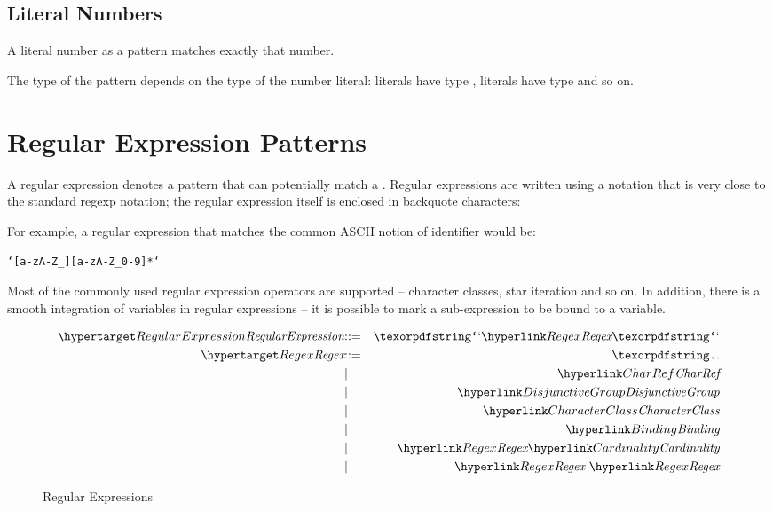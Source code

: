 \subsection{Literal Numbers}
\label{literalNumberPattern}

A literal number as a pattern matches exactly that number.

The type of the pattern depends on the type of the number literal:  literals have type ,  literals have type  and so on.


\section{Regular Expression Patterns}
\label{regularExpressions}
A regular expression denotes a pattern that can potentially match a . Regular expressions are written using a notation that is very close to the standard regexp notation; the regular expression itself is enclosed in backquote characters: 

For example, a regular expression that matches the common ASCII notion of identifier would be:
\begin{alltt}
`[a-zA-Z_][a-zA-Z_0-9]*`
\end{alltt}

Most of the commonly used regular expression operators are supported -- character classes, star iteration and so on. In addition, there is a smooth integration of variables in regular expressions -- it is possible to mark a sub-expression to be bound to a variable.

\begin{figure}[htbp]
\begin{eqnarray*}
\ntDef{RegularExpression}&\arrow&\q{`}\ntRef{Regex}\q{`}\\
\ntDef{Regex}&\arrow&\q{.}\\
&\choice&\ntRef{CharRef}\\
&\choice&\ntRef{DisjunctiveGroup}\\
&\choice&\ntRef{CharacterClass}\\
&\choice&\ntRef{Binding}\\
&\choice&\ntRef{Regex} \ntRef{Cardinality}\\
&\choice&\ntRef{Regex}\ \ntRef{Regex}
\end{eqnarray*}
\caption{Regular Expressions}\label{regexpFig}
\end{figure}

